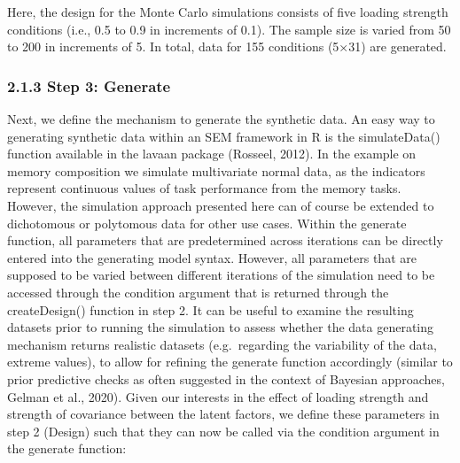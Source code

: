 \documentclass[
  man,floatsintext]{apa6}
\begin{document}
Here, the design for the Monte Carlo simulations consists of five loading strength conditions (i.e., 0.5 to 0.9 in increments of 0.1). The sample size is varied from 50 to 200 in increments of 5. In total, data for 155 conditions (5×31) are generated.

\hypertarget{step-3-generate}{%
\subsubsection{2.1.3 Step 3: Generate}\label{step-3-generate}}

Next, we define the mechanism to generate the synthetic data. An easy way to generating synthetic data within an SEM framework in R is the simulateData() function available in the lavaan package (Rosseel, 2012). In the example on memory composition we simulate multivariate normal data, as the indicators represent continuous values of task performance from the memory tasks. However, the simulation approach presented here can of course be extended to dichotomous or polytomous data for other use cases. Within the generate function, all parameters that are predetermined across iterations can be directly entered into the generating model syntax. However, all parameters that are supposed to be varied between different iterations of the simulation need to be accessed through the condition argument that is returned through the createDesign() function in step 2. It can be useful to examine the resulting datasets prior to running the simulation to assess whether the data generating mechanism returns realistic datasets (e.g.~regarding the variability of the data, extreme values), to allow for refining the generate function accordingly (similar to prior predictive checks as often suggested in the context of Bayesian approaches, Gelman et al., 2020). Given our interests in the effect of loading strength and strength of covariance between the latent factors, we define these parameters in step 2 (Design) such that they can now be called via the condition argument in the generate function:
\end{document}
